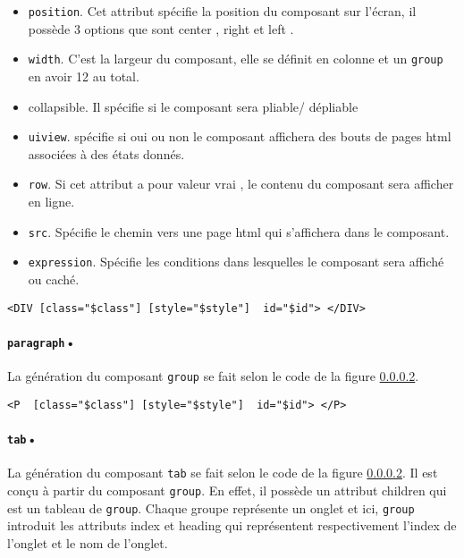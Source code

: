 \documentclass[a4paper,11pt]{report}
\begin{document}
\begin{itemize}
\item {{\tt position}.} Cet attribut spécifie la position du composant sur l'écran, il possède 3 options que sont \og center \fg , \og right \fg et \og left \fg .
\item {{\tt width}.} C'est la largeur du composant, elle se définit en colonne et un {\tt group} en avoir 12 au total.
\item {{collapsible}.} Il spécifie si le composant sera pliable/ dépliable 
\item {{\tt uiview}.} spécifie si oui ou non le composant affichera des bouts de pages html associées à des états donnés.
\item {{\tt row}.} Si cet attribut a pour valeur \og vrai \fg , le contenu du composant sera afficher en ligne.
\item {{\tt src}.} Spécifie le chemin vers une page html qui s'affichera dans le composant.
\item  {{\tt expression}.} Spécifie les  conditions  dans lesquelles le composant sera affiché ou caché.
\end{itemize}

\begin{verbatim}
<DIV [class="$class"] [style="$style"]  id="$id"> </DIV>
\end{verbatim}

\paragraph{{\tt paragraph}• }La génération du composant {\tt group} se fait selon le code de la figure \ref{}.

\begin{verbatim}
<P  [class="$class"] [style="$style"]  id="$id"> </P>
\end{verbatim}
\paragraph{{\tt tab}•}La génération du composant {\tt tab} se fait selon le code de la figure \ref{}. Il est conçu à partir du composant
{\tt group}. En effet, il possède un attribut \og children \fg qui est un tableau de {\tt group}. Chaque groupe représente un onglet et ici, 
{\tt group } introduit les attributs \og index \fg et \og heading \fg qui représentent respectivement l'index de l'onglet et le nom de l'onglet.
\end{document}
